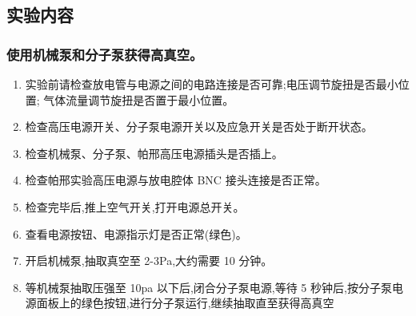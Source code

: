 \documentclass{ctexart}
\begin{document}
\subsection{实验内容}
\subsubsection{使用机械泵和分子泵获得高真空。}
\begin{enumerate}
\item 实验前请检查放电管与电源之间的电路连接是否可靠;电压调节旋扭是否最小位置;
气体流量调节旋扭是否置于最小位置。
\item 检查高压电源开关、分子泵电源开关以及应急开关是否处于断开状态。
\item 检查机械泵、分子泵、帕邢高压电源插头是否插上。
\item 检查帕邢实验高压电源与放电腔体 BNC 接头连接是否正常。
\item 检查完毕后,推上空气开关,打开电源总开关。
\item 查看电源按钮、电源指示灯是否正常(绿色)。
\item 开启机械泵,抽取真空至 2-3Pa,大约需要 10 分钟。
\item 等机械泵抽取压强至 10pa 以下后,闭合分子泵电源,等待 5 秒钟后,按分子泵电源面板上的绿色按钮,进行分子泵运行,继续抽取直至获得高真空
\end{enumerate}
\end{document}
